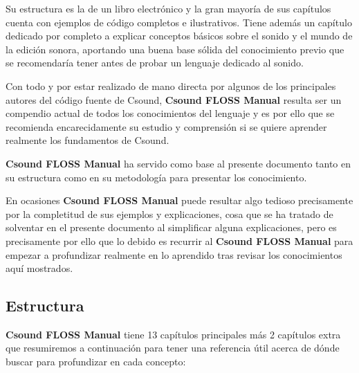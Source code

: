 Su estructura es la de un libro electrónico y la gran mayoría de sus capítulos cuenta con ejemplos de código completos e ilustrativos. Tiene además un capítulo dedicado por completo a explicar conceptos básicos sobre el sonido y el mundo de la edición sonora, aportando una buena base sólida del conocimiento previo que se recomendaría tener antes de probar un lenguaje dedicado al sonido.

Con todo y por estar realizado de mano directa por algunos de los principales autores del código fuente de Csound, \textbf{Csound FLOSS Manual} resulta ser un compendio actual de todos los conocimientos del lenguaje y es por ello que se recomienda encarecidamente su estudio y comprensión si se quiere aprender realmente los fundamentos de Csound.

\textbf{Csound FLOSS Manual} ha servido como base al presente documento tanto en su estructura como en su metodología para presentar los conocimiento.

En ocasiones \textbf{Csound FLOSS Manual} puede resultar algo tedioso precisamente por la completitud de sus ejemplos y explicaciones, cosa que se ha tratado de solventar en el presente documento al simplificar alguna explicaciones, pero es precisamente por ello que lo debido es recurrir al \textbf{Csound FLOSS Manual} para empezar a profundizar realmente en lo aprendido tras revisar los conocimientos aquí mostrados.

\subsection{Estructura}

\textbf{Csound FLOSS Manual} tiene 13 capítulos principales más 2 capítulos extra que resumiremos a continuación para tener una referencia útil acerca de dónde buscar para profundizar en cada concepto:

